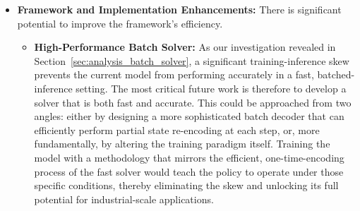 \begin{itemize}
    \item \textbf{Framework and Implementation Enhancements:} There is significant potential to improve the framework's efficiency.
    \begin{itemize}
        \item \textbf{High-Performance Batch Solver:} As our investigation revealed in Section~\ref{sec:analysis_batch_solver}, a significant training-inference skew prevents the current model from performing accurately in a fast, batched-inference setting. The most critical future work is therefore to develop a solver that is both fast and accurate. This could be approached from two angles: either by designing a more sophisticated batch decoder that can efficiently perform partial state re-encoding at each step, or, more fundamentally, by altering the training paradigm itself. Training the model with a methodology that mirrors the efficient, one-time-encoding process of the fast solver would teach the policy to operate under those specific conditions, thereby eliminating the skew and unlocking its full potential for industrial-scale applications.
    \end{itemize}
\end{itemize}